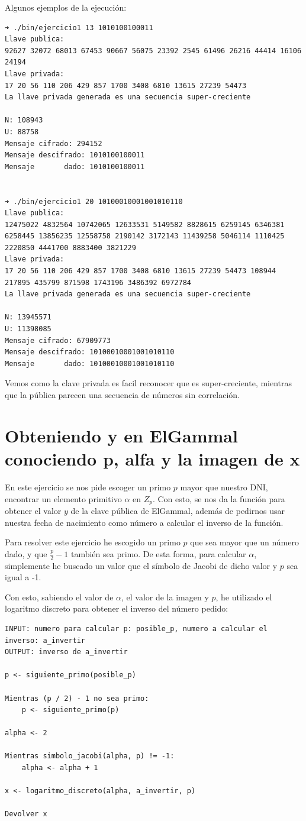 \documentclass[12pt, spanish]{article}
\begin{document}
Algunos ejemplos de la ejecución:

\begin{lstlisting}
➜ ./bin/ejercicio1 13 1010100100011
Llave publica:
92627 32072 68013 67453 90667 56075 23392 2545 61496 26216 44414 16106 24194
Llave privada:
17 20 56 110 206 429 857 1700 3408 6810 13615 27239 54473
La llave privada generada es una secuencia super-creciente

N: 108943
U: 88758
Mensaje cifrado: 294152
Mensaje descifrado: 1010100100011
Mensaje       dado: 1010100100011


➜ ./bin/ejercicio1 20 10100010001001010110
Llave publica:
12475022 4832564 10742065 12633531 5149582 8828615 6259145 6346381 6258445 13856235 12558758 2190142 3172143 11439258 5046114 1110425 2220850 4441700 8883400 3821229
Llave privada:
17 20 56 110 206 429 857 1700 3408 6810 13615 27239 54473 108944 217895 435799 871598 1743196 3486392 6972784
La llave privada generada es una secuencia super-creciente

N: 13945571
U: 11398085
Mensaje cifrado: 67909773
Mensaje descifrado: 10100010001001010110
Mensaje       dado: 10100010001001010110
\end{lstlisting}

Vemos como la clave privada es facil reconocer que es super-creciente, mientras que la pública parecen una secuencia de números sin correlación.

\section{Obteniendo y en ElGammal conociendo p, alfa y la imagen de x}

En este ejercicio se nos pide escoger un primo $p$ mayor que nuestro DNI, encontrar un elemento primitivo $\alpha$ en $Z_p$. Con esto, se nos da la función para obtener el valor $y$ de la clave pública de ElGammal, además de pedirnos usar nuestra fecha de nacimiento como número a calcular el inverso de la función.

Para resolver este ejercicio he escogido un primo $p$ que sea mayor que un número dado, y que $\frac{p}{2} - 1$ también sea primo. De esta forma, para calcular $\alpha$, simplemente he buscado un valor que el símbolo de Jacobi de dicho valor y $p$ sea igual a -1.

Con esto, sabiendo el valor de $\alpha$, el valor de la imagen y $p$, he utilizado el logaritmo discreto para obtener el inverso del número pedido:

\begin{lstlisting}[caption={Ejercicio 2}]
INPUT: numero para calcular p: posible_p, numero a calcular el inverso: a_invertir
OUTPUT: inverso de a_invertir

p <- siguiente_primo(posible_p)

Mientras (p / 2) - 1 no sea primo:
	p <- siguiente_primo(p)

alpha <- 2

Mientras simbolo_jacobi(alpha, p) != -1:
	alpha <- alpha + 1

x <- logaritmo_discreto(alpha, a_invertir, p)

Devolver x
\end{lstlisting}
\end{document}
